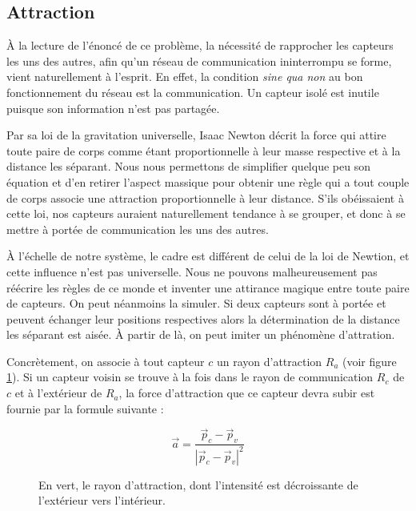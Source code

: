 \documentclass[10pt]{article}
\begin{document}
\begin{multicols}{2}
\subsection*{Attraction}

\`A la lecture de l'énoncé de ce problème, la nécessité de rapprocher
les capteurs les uns des autres, afin qu'un réseau de communication
ininterrompu se forme, vient naturellement à l'esprit. En effet, la
condition \textit{sine qua non} au bon fonctionnement du réseau est la
communication. Un capteur isolé est inutile puisque son
information n'est pas partagée.

Par sa loi de la gravitation universelle, Isaac Newton décrit la force
qui attire toute paire de corps comme étant proportionnelle à leur
masse respective et à la distance les séparant. Nous nous permettons
de simplifier quelque peu son équation et d'en retirer l'aspect
massique pour obtenir une règle qui a tout couple de corps associe une
attraction proportionnelle à leur distance. S'ils obéissaient à cette
loi, nos capteurs auraient naturellement tendance à se grouper, et
donc à se mettre à portée de communication les uns des autres.

\`A l'échelle de notre système, le cadre est différent de celui de la
loi de Newtion, et cette influence n'est pas universelle. Nous ne
pouvons malheureusement pas réécrire les règles de ce monde et
inventer une attirance magique entre toute paire de capteurs. On peut
néanmoins la simuler. Si deux capteurs sont à portée et peuvent
échanger leur positions respectives alors la détermination de la
distance les séparant est aisée. \`A partir de là, on peut imiter un
phénomène d'attration.

Concrètement, on associe à tout capteur $c$ un rayon d'attraction
$R_a$ (voir figure \ref{attraction}). Si un capteur voisin se trouve à
la fois dans le rayon de communication $R_c$ de $c$ et à l'extérieur
de $R_a$, la force d'attraction que ce capteur devra subir est fournie
par la formule suivante :

$$
\vec{a} = \frac{\vec{p}_c - \vec{p}_v}{|\vec{p}_c - \vec{p}_v|^2}
$$

\begin{figure}[H]

  \centering

  

  \caption{En vert, le rayon d'attraction, dont l'intensité est
    décroissante de l'extérieur vers l'intérieur.}
  \label{attraction}


\end{figure}
\end{multicols}
\end{document}
